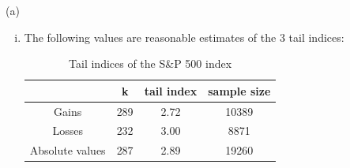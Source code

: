 \documentclass{report}
\begin{document}
\begin{enumerate}[1.]
\begin{enumerate}{(a)}
\begin{enumerate}[(i)]
    \item The following values are reasonable estimates of the 3 tail
      indices:
      \begin{table}[htb!]
        \centering
        \begin{tabular}{c|c|c|c}
          & k & tail index & sample size\\
          \hline
          Gains & 289 & 2.72 & 10389\\
          \hline
          Losses & 232 & 3.00 & 8871\\
          \hline
          Absolute values & 287 & 2.89 & 19260\\
        \end{tabular}
        \caption{Tail indices of the S\&P 500 index}
        \label{tab:SP500_tail_indices}
      \end{table}


\end{enumerate}
\end{enumerate}
\end{enumerate}
\end{document}
